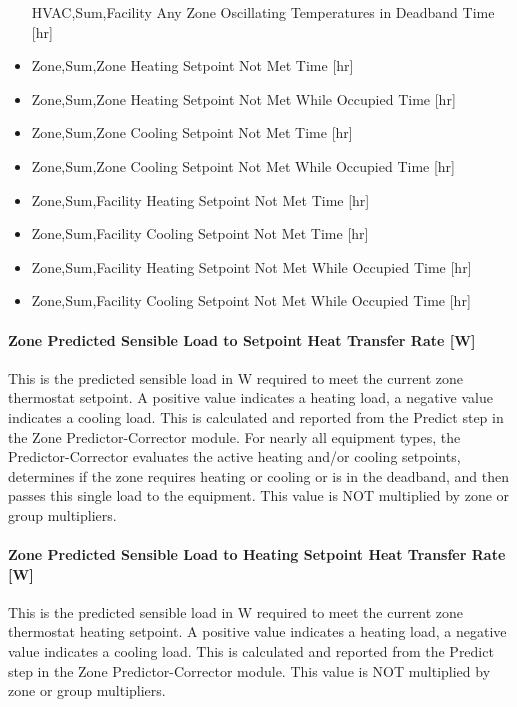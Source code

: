 \begin{itemize}
  HVAC,Sum,Facility Any Zone Oscillating Temperatures in Deadband Time [hr]
\item
  Zone,Sum,Zone Heating Setpoint Not Met Time {[}hr{]}
\item
  Zone,Sum,Zone Heating Setpoint Not Met While Occupied Time {[}hr{]}
\item
  Zone,Sum,Zone Cooling Setpoint Not Met Time {[}hr{]}
\item
  Zone,Sum,Zone Cooling Setpoint Not Met While Occupied Time {[}hr{]}
\item
  Zone,Sum,Facility Heating Setpoint Not Met Time {[}hr{]}
\item
  Zone,Sum,Facility Cooling Setpoint Not Met Time {[}hr{]}
\item
  Zone,Sum,Facility Heating Setpoint Not Met While Occupied Time {[}hr{]}
\item
  Zone,Sum,Facility Cooling Setpoint Not Met While Occupied Time {[}hr{]}
\end{itemize}

\paragraph{Zone Predicted Sensible Load to Setpoint Heat Transfer Rate {[}W{]}}

This is the predicted sensible load in W required to meet the current zone thermostat setpoint. A positive value indicates a heating load, a negative value indicates a cooling load. This is calculated and reported from the Predict step in the Zone Predictor-Corrector module. For nearly all equipment types, the Predictor-Corrector evaluates the active heating and/or cooling setpoints, determines if the zone requires heating or cooling or is in the deadband, and then passes this single load to the equipment. This value is NOT multiplied by zone or group multipliers.

\paragraph{Zone Predicted Sensible Load to Heating Setpoint Heat Transfer Rate {[}W{]}}

This is the predicted sensible load in W required to meet the current zone thermostat heating setpoint. A positive value indicates a heating load, a negative value indicates a cooling load. This is calculated and reported from the Predict step in the Zone Predictor-Corrector module. This value is NOT multiplied by zone or group multipliers.

